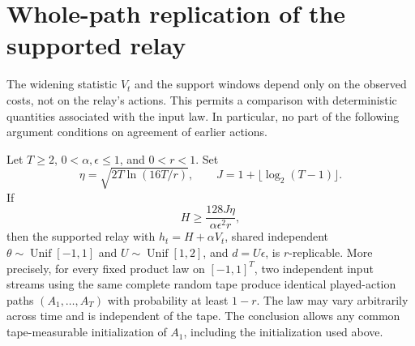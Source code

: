 \section{Whole-path replication of the supported relay}
\label{sec:replication}

The widening statistic $V_t$ and the support windows depend only on the
observed costs, not on the relay's actions. This permits a comparison with
deterministic quantities associated with the input law. In particular, no
part of the following argument conditions on agreement of earlier actions.

\begin{lemma}
\label{lem:relay-replication}
Let $T\ge2$, $0<\alpha,\epsilon\le1$, and $0<r<1$. Set
\begin{equation}
 \eta=\sqrt{2T\ln(16T/r)},\qquad
 J=1+\lfloor\log_2(T-1)\rfloor.
 \label{eq:replication-parameters}
\end{equation}
If
\begin{equation}
 H\ge \frac{128J\eta}{\alpha\epsilon^2r},
 \label{eq:replication-width}
\end{equation}
then the supported relay with $h_t=H+\alpha V_t$, shared independent
$\theta\sim\operatorname{Unif}[-1,1]$ and
$U\sim\operatorname{Unif}[1,2]$, and $d=U\epsilon$, is $r$-replicable.
More precisely, for every fixed product law on $[-1,1]^T$, two independent
input streams using the same complete random tape produce identical
played-action paths $(A_1,\ldots,A_T)$ with probability at least $1-r$.
The law may vary arbitrarily across time and is independent of the tape.
The conclusion allows any common tape-measurable initialization of $A_1$,
including the initialization used above.
\end{lemma}

